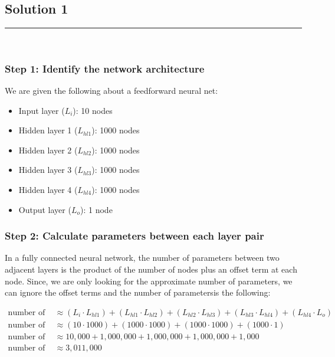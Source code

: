 \documentclass{article}
\begin{document}
\pagestyle{fancy}

\subsection*{Solution 1}
\noindent\rule{\textwidth}{0.4pt}\\

\subsubsection*{Step 1: Identify the network architecture}
\parbox{\textwidth}{
We are given the following about a feedforward neural net:
\begin{itemize}
    \item Input layer ($L_i$): 10 nodes
    \item Hidden layer 1 ($L_{hl1}$): 1000 nodes
    \item Hidden layer 2 ($L_{hl2}$): 1000 nodes
    \item Hidden layer 3 ($L_{hl3}$): 1000 nodes
    \item Hidden layer 4 ($L_{hl4}$): 1000 nodes
    \item Output layer ($L_o$): 1 node
\end{itemize}

}

\subsubsection*{Step 2: Calculate parameters between each layer pair}
\parbox{\textwidth}{
In a fully connected neural network, the number of parameters between two adjacent layers is the product of the number of nodes plus an offset term at each node.
Since, we are only looking for the approximate number of parameters, we can ignore the offset terms and the number of parametersis the following:
\begin{center}
  \begin{align*}
    \text{number of parameters} &\approx (L_i \cdot L_{hl1}) + (L_{hl1} \cdot L_{hl2}) + (L_{hl2} \cdot L_{hl3}) + (L_{hl3} \cdot L_{hl4}) + (L_{hl4} \cdot L_o)\\
    \text{number of parameters} &\approx (10 \cdot 1000) + (1000 \cdot 1000) + (1000 \cdot 1000) + (1000 \cdot 1)\\
    \text{number of parameters} &\approx 10,000 + 1,000,000 + 1,000,000 + 1,000,000 + 1,000\\
    \text{number of parameters} &\approx 3,011,000
  \end{align*}
\end{center}
}
\end{document}
